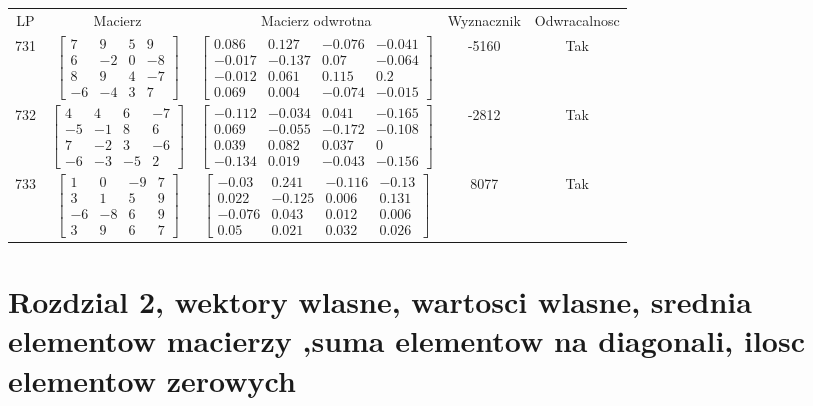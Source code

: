 \documentclass[a4paper,12pt]{article}
\begin{document}
\bgroup {} \vspace{0.2in} \begin{tabular}{c c c c c}
LP & Macierz & Macierz odwrotna & Wyznacznik & Odwracalnosc\\
731
&
$\begin{bmatrix} 7 & 9 & 5 & 9 \\ 6 & -2 & 0 & -8 \\ 8 & 9 & 4 & -7 \\ -6 & -4 & 3 & 7 \end{bmatrix}$
&
$\begin{bmatrix} 0.086 & 0.127 & -0.076 & -0.041 \\ -0.017 & -0.137 & 0.07 & -0.064 \\ -0.012 & 0.061 & 0.115 & 0.2 \\ 0.069 & 0.004 & -0.074 & -0.015 \end{bmatrix}$
&
-5160
&
Tak
\\
732
&
$\begin{bmatrix} 4 & 4 & 6 & -7 \\ -5 & -1 & 8 & 6 \\ 7 & -2 & 3 & -6 \\ -6 & -3 & -5 & 2 \end{bmatrix}$
&
$\begin{bmatrix} -0.112 & -0.034 & 0.041 & -0.165 \\ 0.069 & -0.055 & -0.172 & -0.108 \\ 0.039 & 0.082 & 0.037 & 0 \\ -0.134 & 0.019 & -0.043 & -0.156 \end{bmatrix}$
&
-2812
&
Tak
\\
733
&
$\begin{bmatrix} 1 & 0 & -9 & 7 \\ 3 & 1 & 5 & 9 \\ -6 & -8 & 6 & 9 \\ 3 & 9 & 6 & 7 \end{bmatrix}$
&
$\begin{bmatrix} -0.03 & 0.241 & -0.116 & -0.13 \\ 0.022 & -0.125 & 0.006 & 0.131 \\ -0.076 & 0.043 & 0.012 & 0.006 \\ 0.05 & 0.021 & 0.032 & 0.026 \end{bmatrix}$
&
8077
&
Tak
\\
\end{tabular} \egroup
\vspace*{\fill}\begingroup\section{Rozdzial 2, wektory wlasne, wartosci wlasne, srednia elementow macierzy ,suma elementow na diagonali, ilosc elementow zerowych}\endgroup
\end{document}
